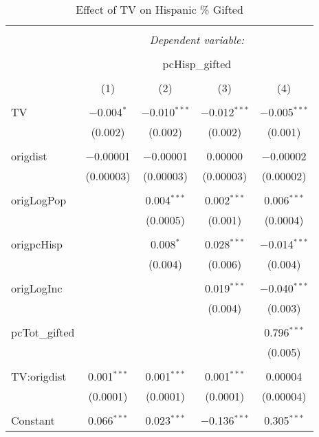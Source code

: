 
\begin{table}[!htbp] \centering 
  \caption{Effect of TV on Hispanic \% Gifted} 
  \label{} 
\begin{tabular}{@{\extracolsep{5pt}}lcccc} 
\\[-1.8ex]\hline 
\hline \\[-1.8ex] 
 & \multicolumn{4}{c}{\textit{Dependent variable:}} \\ 
\cline{2-5} 
\\[-1.8ex] & \multicolumn{4}{c}{pcHisp\_gifted} \\ 
\\[-1.8ex] & (1) & (2) & (3) & (4)\\ 
\hline \\[-1.8ex] 
 TV & $-$0.004$^{*}$ & $-$0.010$^{***}$ & $-$0.012$^{***}$ & $-$0.005$^{***}$ \\ 
  & (0.002) & (0.002) & (0.002) & (0.001) \\ 
  & & & & \\ 
 origdist & $-$0.00001 & $-$0.00001 & 0.00000 & $-$0.00002 \\ 
  & (0.00003) & (0.00003) & (0.00003) & (0.00002) \\ 
  & & & & \\ 
 origLogPop &  & 0.004$^{***}$ & 0.002$^{***}$ & 0.006$^{***}$ \\ 
  &  & (0.0005) & (0.001) & (0.0004) \\ 
  & & & & \\ 
 origpcHisp &  & 0.008$^{*}$ & 0.028$^{***}$ & $-$0.014$^{***}$ \\ 
  &  & (0.004) & (0.006) & (0.004) \\ 
  & & & & \\ 
 origLogInc &  &  & 0.019$^{***}$ & $-$0.040$^{***}$ \\ 
  &  &  & (0.004) & (0.003) \\ 
  & & & & \\ 
 pcTot\_gifted &  &  &  & 0.796$^{***}$ \\ 
  &  &  &  & (0.005) \\ 
  & & & & \\ 
 TV:origdist & 0.001$^{***}$ & 0.001$^{***}$ & 0.001$^{***}$ & 0.00004 \\ 
  & (0.0001) & (0.0001) & (0.0001) & (0.00004) \\ 
  & & & & \\ 
 Constant & 0.066$^{***}$ & 0.023$^{***}$ & $-$0.136$^{***}$ & 0.305$^{***}$ \\ 

\end{tabular}
\end{table}
